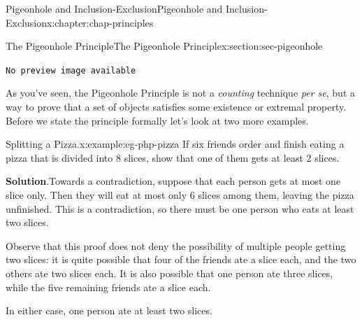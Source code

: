 \documentclass[oneside,10pt,]{book}
\newcommand{\blocktitlefont}{\relax}
\newcommand{\mono}[1]{\texttt{#1}}
\numberwithin{equation}{section}
\newlength{\qrsize}
\newlength{\previewwidth}
\begin{document}
\begin{chapterptx}{Pigeonhole and Inclusion-Exclusion}{}{Pigeonhole and Inclusion-Exclusion}{}{}{x:chapter:chap-principles}
\begin{sectionptx}{The Pigeonhole Principle}{}{The Pigeonhole Principle}{}{}{x:section:sec-pigeonhole}
\begin{sidebyside}{1}{0.1}{0.1}{0}
\begin{sbspanel}{0.8}
\addtolength{\previewwidth}{-\qrsize}
\begin{tcbraster}[raster columns=2, raster column skip=1pt, raster halign=center, raster force size=false, raster left skip=0pt, raster right skip=0pt]%
\begin{tcolorbox}[previewstyle, width=\previewwidth]%
\mono{No preview image available}%
\end{tcolorbox}%
\begin{tcolorbox}[qrstyle]%
{\hypersetup{urlcolor=black}}%
\end{tcolorbox}%
\end{tcbraster}%
\end{sbspanel}%
\end{sidebyside}%
\par
As you've seen, the Pigeonhole Principle is not a \emph{counting} technique \emph{per se}, but a way to prove that a set of objects satisfies some existence or extremal property. Before we state the principle formally let's look at two more examples.%
\begin{example}{Splitting a Pizza.}{x:example:eg-php-pizza}%
If six friends order and finish eating a pizza that is divided into 8 slices, show that one of them gets at least 2 slices.%
\par\smallskip%
\noindent\textbf{\blocktitlefont Solution}.\hypertarget{g:solution:id531869}{}\quad{}Towards a contradiction, suppose that each person gets at most one slice only. Then they will eat at most only 6 slices among them, leaving the pizza unfinished. This is a contradiction, so there must be one person who eats at least two slices.%
\par
Observe that this proof does not deny the possibility of multiple people getting two slices: it is quite possible that four of the friends ate a slice each, and the two others ate two slices each. It is also possible that one person ate three slices, while the five remaining friends ate a slice each.%
\par
In either case, one person ate at least two slices.%
\end{example}
%
\begin{sidebyside}{1}{0.325}{0.325}{0}%
\begin{sbspanel}{0.35}%
\end{sbspanel}
\end{sidebyside}
\end{sectionptx}
\end{chapterptx}
\end{document}
